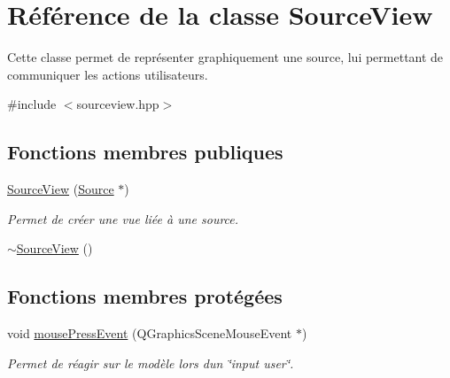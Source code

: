 \hypertarget{classSourceView}{}\section{Référence de la classe Source\+View}
\label{classSourceView}


Cette classe permet de représenter graphiquement une source, lui permettant de communiquer les actions utilisateurs.  




{\ttfamily \#include $<$sourceview.\+hpp$>$}

\subsection*{Fonctions membres publiques}
\begin{DoxyCompactItemize}
\item 
\hyperlink{classSourceView_a21ea9c4e88fc2cc79b9cd9001f7333f2}{Source\+View} (\hyperlink{classSource}{Source} $\ast$)
\begin{DoxyCompactList}\small\item\em Permet de créer une vue liée à une source. \end{DoxyCompactList}\item 
\hyperlink{classSourceView_aee500dba1590df1506a972b245a65f37}{$\sim$\+Source\+View} ()
\end{DoxyCompactItemize}
\subsection*{Fonctions membres protégées}
\begin{DoxyCompactItemize}
\item 
void \hyperlink{classSourceView_af2fd6dc466853974e482701139ef66c9}{mouse\+Press\+Event} (Q\+Graphics\+Scene\+Mouse\+Event $\ast$)
\begin{DoxyCompactList}\small\item\em Permet de réagir sur le modèle lors d\textquotesingle{}un \char`\"{}input user\char`\"{}. \end{DoxyCompactList}\end{DoxyCompactItemize}
